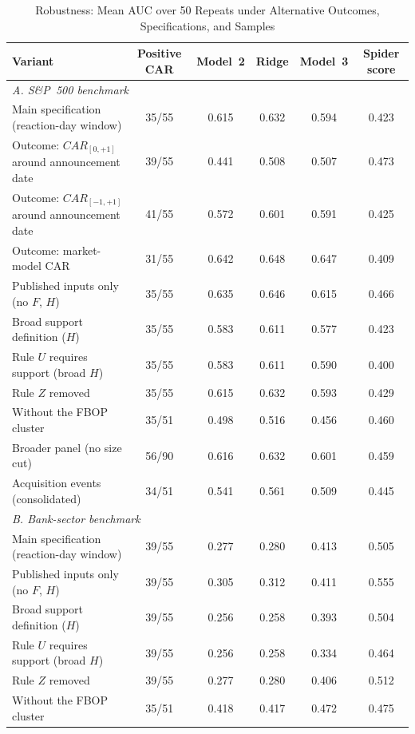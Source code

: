 \begin{table}[!t]
\caption{Robustness: Mean AUC over 50 Repeats under Alternative Outcomes, Specifications, and Samples}
\label{tab:robustness}
\centering
\footnotesize
\begin{tabular*}{\textwidth}{@{\extracolsep{\fill}}lccccc}
\toprule
\textbf{Variant} & \textbf{Positive CAR} & \textbf{Model~2} & \textbf{Ridge} & \textbf{Model~3} & \textbf{Spider score} \\
\midrule
\multicolumn{6}{l}{\textit{A. S\&P~500 benchmark}} \\
Main specification (reaction-day window) & 35/55 & 0.615 & 0.632 & 0.594 & 0.423 \\
Outcome: $CAR_{[0,+1]}$ around announcement date & 39/55 & 0.441 & 0.508 & 0.507 & 0.473 \\
Outcome: $CAR_{[-1,+1]}$ around announcement date & 41/55 & 0.572 & 0.601 & 0.591 & 0.425 \\
Outcome: market-model CAR & 31/55 & 0.642 & 0.648 & 0.647 & 0.409 \\
Published inputs only (no $F$, $H$) & 35/55 & 0.635 & 0.646 & 0.615 & 0.466 \\
Broad support definition ($H$) & 35/55 & 0.583 & 0.611 & 0.577 & 0.423 \\
Rule $U$ requires support (broad $H$) & 35/55 & 0.583 & 0.611 & 0.590 & 0.400 \\
Rule $Z$ removed & 35/55 & 0.615 & 0.632 & 0.593 & 0.429 \\
Without the FBOP cluster & 35/51 & 0.498 & 0.516 & 0.456 & 0.460 \\
\midrule
Broader panel (no size cut) & 56/90 & 0.616 & 0.632 & 0.601 & 0.459 \\
Acquisition events (consolidated) & 34/51 & 0.541 & 0.561 & 0.509 & 0.445 \\
\midrule
\multicolumn{6}{l}{\textit{B. Bank-sector benchmark}} \\
Main specification (reaction-day window) & 39/55 & 0.277 & 0.280 & 0.413 & 0.505 \\
Published inputs only (no $F$, $H$) & 39/55 & 0.305 & 0.312 & 0.411 & 0.555 \\
Broad support definition ($H$) & 39/55 & 0.256 & 0.258 & 0.393 & 0.504 \\
Rule $U$ requires support (broad $H$) & 39/55 & 0.256 & 0.258 & 0.334 & 0.464 \\
Rule $Z$ removed & 39/55 & 0.277 & 0.280 & 0.406 & 0.512 \\
Without the FBOP cluster & 35/51 & 0.418 & 0.417 & 0.472 & 0.475 \\

\end{tabular*}
\end{table}
